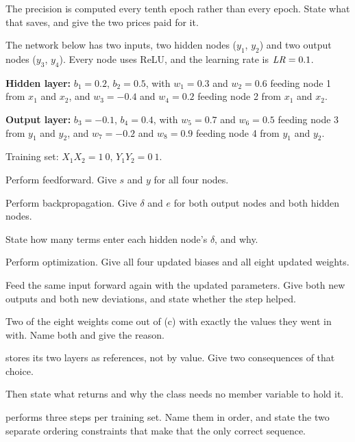  The precision is computed every tenth epoch rather than every epoch. State what that
saves, and give the two prices paid for it. 

\label{exb:q:3}
The network below has two inputs, two hidden nodes ($y_1$, $y_2$) and two output nodes ($y_3$,
$y_4$). Every node uses ReLU, and the learning rate is $\mathit{LR} = 0.1$.

\textbf{Hidden layer:} $b_1 = 0.2$, $b_2 = 0.5$, with $w_1 = 0.3$ and $w_2 = 0.6$ feeding node 1
from $x_1$ and $x_2$, and $w_3 = -0.4$ and $w_4 = 0.2$ feeding node 2 from $x_1$ and $x_2$.

\textbf{Output layer:} $b_3 = -0.1$, $b_4 = 0.4$, with $w_5 = 0.7$ and $w_6 = 0.5$ feeding node 3
from $y_1$ and $y_2$, and $w_7 = -0.2$ and $w_8 = 0.9$ feeding node 4 from $y_1$ and $y_2$.

Training set: $X_1X_2 = 1\ 0$, $Y_1Y_2 = 0\ 1$.

 Perform feedforward. Give $s$ and $y$ for all four nodes. 

 Perform backpropagation. Give $\delta$ and $e$ for both output nodes and both hidden
nodes.

State how many terms enter each hidden node's $\delta$, and why. 

 Perform optimization. Give all four updated biases and all eight updated weights.

 Feed the same input forward again with the updated parameters. Give both new outputs and
both new deviations, and state whether the step helped. 

 Two of the eight weights come out of (c) with exactly the values they went in with. Name
both and give the reason. 

\label{exb:q:4}

  stores its two layers as references, not by value. Give two consequences
of that choice.

Then state what  returns and why the class needs no member variable to hold it.

  performs three steps per training set. Name them in order, and state the
two separate ordering constraints that make that the only correct sequence. 

